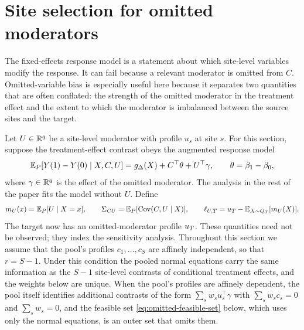 \section{Site selection for omitted moderators}
\label{sec:omitted-moderator}

The fixed-effects response model is a statement about which site-level
variables modify the response. It can fail because a relevant moderator is
omitted from $C$. Omitted-variable bias is especially useful here because it
separates two quantities that are often conflated: the strength of the omitted
moderator in the treatment effect and the extent to which the moderator is
imbalanced between the source sites and the target.

Let $U\in\mathbb{R}^q$ be a site-level moderator with profile $u_s$ at site $s$.
For this section, suppose the treatment-effect contrast obeys the augmented
response model
\begin{equation}
  \mathbb{E}_P[Y(1)-Y(0)\mid X,C,U]
  =g_\Delta(X)+C^\top\theta+U^\top\gamma,
  \qquad
  \theta=\beta_1-\beta_0,
  \label{eq:omitted-response-model}
\end{equation}
where $\gamma\in\mathbb{R}^q$ is the effect of the omitted moderator. The analysis in
the rest of the paper fits the model without $U$. Define
\begin{equation}
  m_U(x)=\mathbb{E}_P[U\mid X=x],
  \qquad
  \Sigma_{CU}=\mathbb{E}_P[{\rm Cov}(C,U\mid X)],
  \qquad
  \ell_{U,T}=u_T-\mathbb{E}_{X\sim Q_T}[m_U(X)].
  \label{eq:omitted-objects}
\end{equation}
The target now has an omitted-moderator profile $u_T$. These quantities need
not be observed; they index the sensitivity analysis. Throughout this
section we assume that the pool's profiles $c_1,\ldots,c_S$ are affinely
independent, so that $r=S-1$. Under this condition the pooled normal
equations carry the same information as the $S-1$ site-level contrasts
of conditional treatment effects, and the weights below are unique. When
the pool's profiles are affinely dependent, the pool itself identifies
additional contrasts of the form $\sum_s w_s u_s^\top\gamma$ with
$\sum_s w_sc_s=0$ and $\sum_s w_s=0$, and the feasible set
\eqref{eq:omitted-feasible-set} below, which uses only the normal
equations, is an outer set that omits them.

